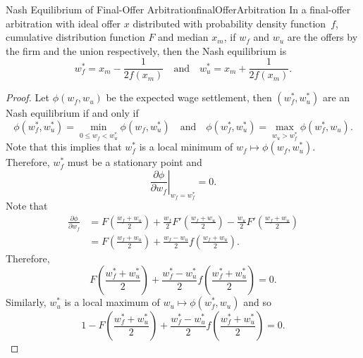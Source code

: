 \documentclass[math]{amznotes}
\theoremstyle{remark}
\begin{document}
\begin{probox}{Nash Equilibrium of Final-Offer Arbitration}{finalOfferArbitration}
    In a final-offer arbitration with ideal offer $x$ distributed with probability density function~$f$, cumulative distribution function $F$ and median $x_m$, if $w_f$ and $w_u$ are the offers by the firm and the union respectively, then the Nash equilibrium is 
    \begin{equation*}
        w_f^* = x_m - \frac{1}{2f\left(x_m\right)} \quad\textrm{and}\quad w_u^* = x_m + \frac{1}{2f\left(x_m\right)}.
    \end{equation*}
    \tcblower
    \begin{proof}
        Let $\phi\left(w_f, w_u\right)$ be the expected wage settlement, then $\left(w_f^*, w_u^*\right)$ are an Nash equilibrium if and only if 
        \begin{equation*}
            \phi\left(w_f^*, w_u^*\right) = \min_{0 \leq w_f < w_u^*}\phi\left(w_f, w_u^*\right) \quad\textrm{and}\quad \phi\left(w_f^*, w_u^*\right) = \max_{w_u > w_f^*}\phi\left(w_f^*, w_u\right).
        \end{equation*}
        Note that this implies that $w_f^*$ is a local minimum of $w_f \mapsto \phi\left(w_f, w_u^*\right)$. Therefore, $w_f^*$ must be a stationary point and 
        \begin{equation*}
            \left.\frac{\partial \phi}{\partial w_f}\right\rvert_{w_f = w_f^*} = 0.
        \end{equation*}
        Note that
        \begin{align*}
            \frac{\partial \phi}{\partial w_f} & = F\left(\frac{w_f + w_u}{2}\right) + \frac{w_f}{2}F'\left(\frac{w_f + w_u}{2}\right) - \frac{w_u}{2}F'\left(\frac{w_f + w_u}{2}\right) \\
            & = F\left(\frac{w_f + w_u}{2}\right) + \frac{w_f - w_u}{2}f\left(\frac{w_f + w_u}{2}\right).
        \end{align*}
        Therefore, 
        \begin{equation*}
            F\left(\frac{w_f^* + w_u^*}{2}\right) + \frac{w_f^* - w_u^*}{2}f\left(\frac{w_f^* + w_u^*}{2}\right) = 0.
        \end{equation*}
        Similarly, $w_u^*$ is a local maximum of $w_u \mapsto \phi\left(w_f^*, w_u\right)$ and so 
        \begin{equation*}
            1 - F\left(\frac{w_f^* + w_u^*}{2}\right) + \frac{w_f^* - w_u^*}{2}f\left(\frac{w_f^* + w_u^*}{2}\right) = 0.
        \end{equation*}

\end{proof}
\end{probox}
\end{document}
